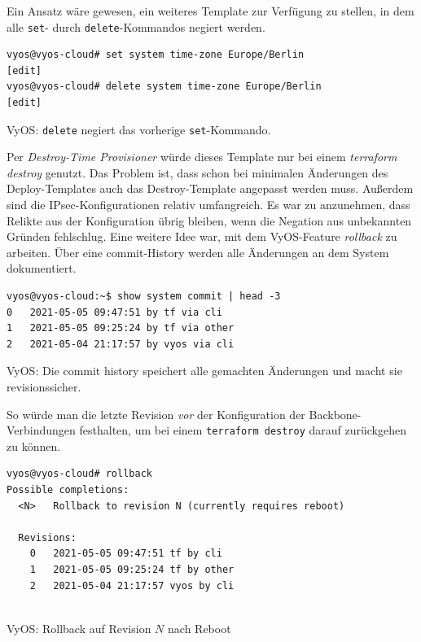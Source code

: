 Ein Ansatz wäre gewesen, ein weiteres Template zur Verfügung zu stellen, in dem alle \texttt{set}- durch \texttt{delete}-Kommandos negiert werden.\\
\begin{listing}[h]
\begin{verbatim}
vyos@vyos-cloud# set system time-zone Europe/Berlin
[edit]
vyos@vyos-cloud# delete system time-zone Europe/Berlin
[edit]
\end{verbatim}
\caption{VyOS: \texttt{delete} negiert das vorherige \texttt{set}-Kommando.}
\label{set-delete-vyos}
\end{listing}
Per \textit{Destroy-Time Provisioner} würde dieses Template nur bei einem \textit{terraform destroy} genutzt\cite{destroytimeprovtf2021}. Das Problem ist, dass schon bei minimalen Änderungen des Deploy-Templates auch das Destroy-Template angepasst werden muss.
Außerdem sind die IPsec-Konfigurationen relativ umfangreich. Es war zu anzunehmen, dass Relikte aus der Konfiguration übrig bleiben, wenn die Negation aus unbekannten Gründen fehlschlug.
Eine weitere Idee war, mit dem VyOS-Feature \textit{rollback} zu arbeiten. Über eine commit-History werden alle Änderungen an dem System dokumentiert.
\begin{listing}[h]
\begin{verbatim}
vyos@vyos-cloud:~$ show system commit | head -3
0   2021-05-05 09:47:51 by tf via cli
1   2021-05-05 09:25:24 by tf via other
2   2021-05-04 21:17:57 by vyos via cli

\end{verbatim}
\caption{VyOS: Die commit history speichert alle gemachten Änderungen und macht sie revisionssicher.}
\label{commit-history-vyos}
\end{listing}\FloatBarrier
So würde man die letzte Revision \textit{vor} der Konfiguration der Backbone-Verbindungen festhalten, um bei einem \texttt{terraform destroy} darauf zurückgehen zu können.
\begin{listing}[h]
\begin{verbatim}
vyos@vyos-cloud# rollback
Possible completions:
  <N>   Rollback to revision N (currently requires reboot)

  Revisions:
    0   2021-05-05 09:47:51 tf by cli
    1   2021-05-05 09:25:24 tf by other
    2   2021-05-04 21:17:57 vyos by cli
    
\end{verbatim}
\caption{VyOS: Rollback auf Revision $N$ nach Reboot}
\label{rollback-cmd-vyos}
\end{listing}\FloatBarrier
